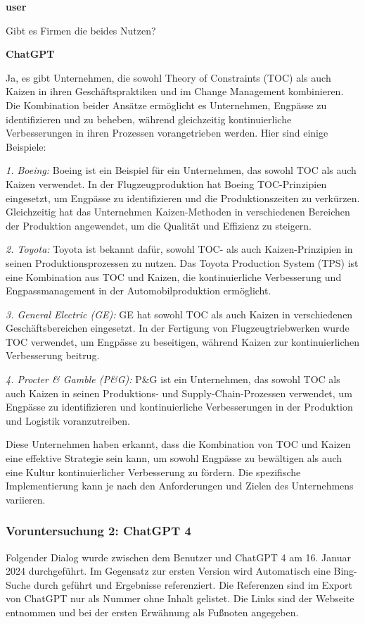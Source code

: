 \textbf{user}

Gibt es Firmen die beides Nutzen? 

\textbf{ChatGPT}

Ja, es gibt Unternehmen, die sowohl Theory of Constraints (TOC) als auch Kaizen in ihren Geschäftspraktiken und im Change Management kombinieren. Die Kombination beider Ansätze ermöglicht es Unternehmen, Engpässe zu identifizieren und zu beheben, während gleichzeitig kontinuierliche Verbesserungen in ihren Prozessen vorangetrieben werden. Hier sind einige Beispiele:

\textit{1. Boeing:} Boeing ist ein Beispiel für ein Unternehmen, das sowohl TOC als auch Kaizen verwendet. In der Flugzeugproduktion hat Boeing TOC-Prinzipien eingesetzt, um Engpässe zu identifizieren und die Produktionszeiten zu verkürzen. Gleichzeitig hat das Unternehmen Kaizen-Methoden in verschiedenen Bereichen der Produktion angewendet, um die Qualität und Effizienz zu steigern.

\textit{2. Toyota:} Toyota ist bekannt dafür, sowohl TOC- als auch Kaizen-Prinzipien in seinen Produktionsprozessen zu nutzen. Das Toyota Production System (TPS) ist eine Kombination aus TOC und Kaizen, die kontinuierliche Verbesserung und Engpassmanagement in der Automobilproduktion ermöglicht.

\textit{3. General Electric (GE):} GE hat sowohl TOC als auch Kaizen in verschiedenen Geschäftsbereichen eingesetzt. In der Fertigung von Flugzeugtriebwerken wurde TOC verwendet, um Engpässe zu beseitigen, während Kaizen zur kontinuierlichen Verbesserung beitrug.

\textit{4. Procter \& Gamble (P\&G):} P\&G ist ein Unternehmen, das sowohl TOC als auch Kaizen in seinen Produktions- und Supply-Chain-Prozessen verwendet, um Engpässe zu identifizieren und kontinuierliche Verbesserungen in der Produktion und Logistik voranzutreiben.

Diese Unternehmen haben erkannt, dass die Kombination von TOC und Kaizen eine effektive Strategie sein kann, um sowohl Engpässe zu bewältigen als auch eine Kultur kontinuierlicher Verbesserung zu fördern. Die spezifische Implementierung kann je nach den Anforderungen und Zielen des Unternehmens variieren.


\subsubsection{Voruntersuchung 2: ChatGPT 4}\label{sec:voruntersuch4}

Folgender Dialog wurde zwischen dem Benutzer und ChatGPT 4 am 16. Januar 2024 durchgeführt. Im Gegensatz zur ersten Version wird Automatisch eine Bing-Suche durch geführt und Ergebnisse referenziert. Die Referenzen sind im Export von ChatGPT nur als Nummer ohne Inhalt gelistet. Die Links sind der Webseite entnommen und bei der ersten Erwähnung als Fußnoten angegeben.

